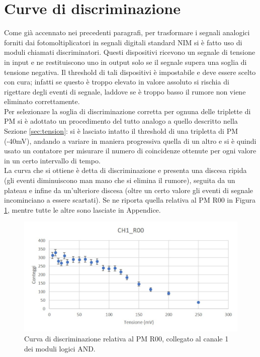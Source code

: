 \documentclass{standalone}
\begin{document}
	\section{Curve di discriminazione}
	\label{sec:discrimination}
	Come gi\`a accennato nei precedenti paragrafi, per trasformare i segnali analogici forniti dai fotomoltiplicatori in segnali digitali standard NIM si \`e fatto uso di moduli chiamati discriminatori. Questi dispositivi ricevono un segnale di tensione in input e ne restituiscono uno in output solo se il segnale supera una soglia di tensione negativa. Il threshold di tali dispositivi \`e impostabile e deve essere scelto con cura; infatti se questo \`e troppo elevato in valore assoluto si rischia di rigettare degli eventi di segnale, laddove se \`e troppo basso il rumore non viene eliminato correttamente.\\
	Per selezionare la soglia di discriminazione corretta per ognuna delle triplette di PM si \`e adottato un procedimento del tutto analogo a quello descritto nella Sezione \ref{sec:tension}: si \`e lasciato intatto il threshold di una tripletta di PM (-40mV), andando a variare in maniera progressiva quella di un altro e si \`e quindi usato un contatore per misurare il numero di coincidenze ottenute per ogni valore in un certo intervallo di tempo.\\
	La curva che si ottiene \`e detta di discriminazione e presenta una discesa ripida (gli eventi diminuiscono man mano che si elimina il rumore), seguita da un plateau e infine da un'ulteriore discesa (oltre un certo valore gli eventi di segnale incominciano a essere scartati). Se ne riporta quella relativa al PM R00 in Figura \ref{fig:discrimination}, mentre tutte le altre sono lasciate in Appendice.\\

	\begin{figure}[H]
		\begin{center}
			\includegraphics[width=1\textwidth]{./excel-plots/disc-R00.jpg} %
      \caption{\small Curva di discriminazione relativa al PM R00, collegato al canale 1 dei moduli logici AND.}
			\label{fig:discrimination}
		\end{center}
	\end{figure}
\end{document}
